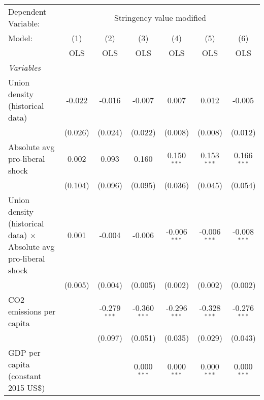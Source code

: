 
\begingroup
\centering
\begin{tabular}{lcccccc}
   \toprule
   Dependent Variable: & \multicolumn{6}{c}{Stringency value modified}\\
   Model:                                                                   & (1)     & (2)            & (3)            & (4)            & (5)            & (6)\\  
                                                                            &  OLS    & OLS            & OLS            & OLS            & OLS            & OLS\\  
   \midrule
   \emph{Variables}\\
   Union density (historical data)                                          & -0.022  & -0.016         & -0.007         & 0.007          & 0.012          & -0.005\\   
                                                                            & (0.026) & (0.024)        & (0.022)        & (0.008)        & (0.008)        & (0.012)\\   
   Absolute avg pro-liberal shock                                           & 0.002   & 0.093          & 0.160          & 0.150$^{***}$  & 0.153$^{***}$  & 0.166$^{***}$\\   
                                                                            & (0.104) & (0.096)        & (0.095)        & (0.036)        & (0.045)        & (0.054)\\   
   Union density (historical data) $\times$ Absolute avg pro-liberal shock  & 0.001   & -0.004         & -0.006         & -0.006$^{***}$ & -0.006$^{***}$ & -0.008$^{***}$\\   
                                                                            & (0.005) & (0.004)        & (0.005)        & (0.002)        & (0.002)        & (0.002)\\   
   CO2 emissions per capita                                                 &         & -0.279$^{***}$ & -0.360$^{***}$ & -0.296$^{***}$ & -0.328$^{***}$ & -0.276$^{***}$\\   
                                                                            &         & (0.097)        & (0.051)        & (0.035)        & (0.029)        & (0.043)\\   
   GDP per capita (constant 2015 US\$)                                      &         &                & 0.000$^{***}$  & 0.000$^{***}$  & 0.000$^{***}$  & 0.000$^{***}$\\   

\end{tabular}
